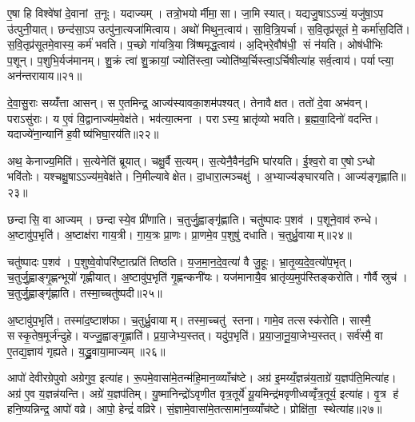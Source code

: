 ए॒षा हि विश्वे॑षां दे॒वानां त॒नूः। यदाज्यम्। तत्रो॒भयोर्मीमा॒सा। जा॒मि स्यात्। यद्यजु॒षाऽऽज्यं॒ यजु॑षा॒ऽप उ॑त्पुनी॒यात्। छन्द॑सा॒ऽप उत्पु॑ना॒त्यजा॑मित्वाय। अथो॑ मिथुन॒त्वाय॑। सा॒वि॒त्रि॒यर्चा। स॒वि॒तृप्र॑सूतं मे॒ कर्मा॑स॒दिति॑। स॒वि॒तृप्र॑सूतमे॒वास्य॒ कर्म॑ भवति। प॒च्छो गा॑यत्रि॒या त्रि॑ष्षमृद्ध॒त्वाय॑। अ॒द्भिरे॒वौष॑धी॒ सं न॑यति। ओष॑धीभिः प॒शून्। प॒शुभि॒र्यज॑मानम्। शु॒क्रं त्वा॑ शु॒क्रायां॒ ज्योति॑स्त्वा॒ ज्योति॑ष्य॒र्चिस्त्वा॒ऽर्चिषीत्या॑ह सर्व॒त्वाय॑। पर्याप्त्या॒ अन॑न्तरायाय॥२१॥\anuvakamend[ई॒क्ष॒त॒ आ॒ह॒ शा॒स्ते॒ लो॒का दे॒वता॑ भवति॒ षट् च॑]

दे॒वा॒सु॒राः सय्यँ॑त्ता आसन्। स ए॒तमिन्द्र॒ आज्य॑स्यावका॒शम॑पश्यत्। तेनावैक्षत। ततो॑ दे॒वा अभ॑वन्। पराऽसु॑राः। य ए॒वं वि॒द्वानाज्य॑म॒वेक्ष॑ते। भव॑त्या॒त्मना। पराऽस्य॒ भ्रातृ॑व्यो भवति। ब्र॒ह्म॒वा॒दिनो॑ वदन्ति। यदाज्ये॑ना॒न्यानि॑ ह॒वीष्य॑भिघा॒रय॑ति॥२२॥

अथ॒ केनाज्य॒मिति॑। स॒त्येनेति॑ ब्रूयात्। चक्षु॒र्वै स॒त्यम्। स॒त्येनै॒वैन॑द॒भि घा॑रयति। ई॒श्व॒रो वा ए॒षोऽन्धो भवि॑तोः। यश्चक्षु॒षाऽऽज्य॑म॒वेक्ष॑ते। नि॒मील्यावेक्षेत। दा॒धारा॒त्मञ्चक्षु॑। अ॒भ्याज्य॑ङ्घारयति। आज्य॑ङ्गृह्णाति॥२३॥

छन्दासि॒ वा आज्यम्। छन्दास्ये॒व प्री॑णाति। च॒तुर्जु॒ह्वाङ्गृ॑ह्णाति। चतु॑ष्पादः प॒शव॑। प॒शूने॒वाव॑ रुन्धे। अ॒ष्टावु॑प॒भृति॑। अ॒ष्टाक्ष॑रा गाय॒त्री। गा॒य॒त्रः प्रा॒णः। प्रा॒णमे॒व प॒शुषु॑ दधाति। च॒तुर्ध्रु॒वायाम्॥२४॥

चतु॑ष्पादः प॒शव॑। प॒शुष्वे॒वोपरि॑ष्टा॒त्प्रति॑ तिष्ठति। य॒ज॒मा॒न॒दे॒व॒त्या॑ वै जु॒हूः। भ्रा॒तृ॒व्य॒दे॒व॒त्यो॑प॒भृत्। च॒तुर्जु॒ह्वाङ्गृ॒ह्णन्भूयो॑ गृह्णीयात्। अ॒ष्टावु॑प॒भृति॑ गृ॒ह्णन्कनी॑यः। यज॑मानायै॒व भ्रातृ॑व्य॒मुप॑स्तिङ्करोति। गौर्वै स्रुच॑। च॒तुर्जु॒ह्वाङ्गृ॑ह्णाति। तस्मा॒च्चतु॑ष्पदी॥२५॥

अ॒ष्टावु॑प॒भृति॑। तस्मा॑द॒ष्टाश॑फा। च॒तुर्ध्रु॒वायाम्। तस्मा॒च्चतु॑ स्तना। गामे॒व तत्सस्क॑रोति। सास्मै॒ सस्कृ॒तेष॒मूर्ज॑न्दुहे। यज्जु॒ह्वाङ्गृ॒ह्णाति॑। प्र॒या॒जेभ्य॒स्तत्। यदु॑प॒भृति॑। प्र॒या॒जा॒नू॒या॒जेभ्य॒स्तत्। सर्व॑स्मै॒ वा ए॒तद्य॒ज्ञाय॑ गृह्यते। य॒द्ध्रु॒वाया॒माज्यम्॥२६॥\anuvakamend[अ॒भि॒घा॒रय॑ति गृह्णाति ध्रु॒वाया॒ञ्चतु॑ष्पदी प्रयाजानूया॒जेभ्य॒स्तद्द्वे च॑]

आपो॑ देवीरग्रेपुवो अग्रेगुव॒ इत्या॑ह। रू॒पमे॒वासा॑मे॒तन्म॑हि॒मान॒व्व्याँच॑ष्टे। अग्र॑ इ॒मय्यँ॒ज्ञन्न॑य॒ताग्रे॑ य॒ज्ञप॑ति॒मित्या॑ह। अग्र॑ ए॒व य॒ज्ञन्न॑यन्ति। अग्रे॑ य॒ज्ञप॑तिम्। यु॒ष्मानिन्द्रो॑ऽवृणीत वृत्र॒तूर्ये॑ यू॒यमिन्द्र॑मवृणीध्वव्वृँत्र॒तूर्य॒ इत्या॑ह। वृ॒त्र ह॑ हनि॒ष्यन्निन्द्र॒ आपो॑ वव्रे। आपो॒ हेन्द्रं॑ वव्रिरे। सं॒ज्ञामे॒वासा॑मे॒तत्सामा॑न॒व्व्याँच॑ष्टे। प्रोक्षि॑ता॒ स्थेत्या॑ह॥२७॥

